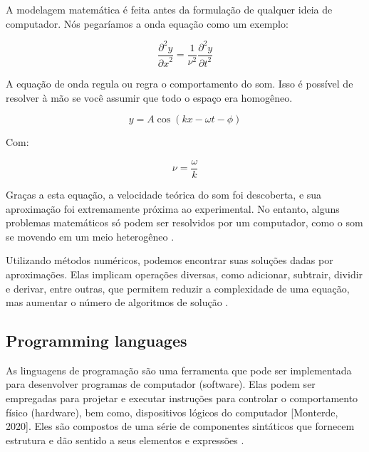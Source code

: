 \documentclass[11pt, letterpaper, portuguese]{article}
\begin{document}
\par{A modelagem matemática é feita antes da formulação de qualquer ideia de computador. Nós pegaríamos a onda equação como um exemplo:}

\begin{equation}
    \frac{\partial^2 y}{{\partial x}^2}=\frac{1}{\nu^2} \frac{\partial^2 y}{{\partial t}^2}
\end{equation}

\par{A equação de onda regula ou regra o comportamento do som. Isso é possível de resolver à mão se você assumir que todo o espaço era homogêneo. }

\begin{equation*}
    y= A \cos{ \left( k x - \omega t - \phi \right) }
\end{equation*}

\par{Com:}

\begin{equation*}
    \nu = \frac{ \omega }{ k }
\end{equation*}

\par{Graças a esta equação, a velocidade teórica do som foi descoberta, e sua aproximação foi extremamente próxima ao experimental. No entanto, alguns problemas matemáticos só podem ser resolvidos por um computador, como o som se movendo em um meio heterogêneo  \cite{garfinkel_shevtsov_guo_2017}.}

\par{Utilizando métodos numéricos, podemos encontrar suas soluções dadas por aproximações. Elas implicam operações diversas, como adicionar, subtrair, dividir e derivar, entre outras, que permitem reduzir a complexidade de uma equação, mas aumentar o número de algoritmos de solução  \cite{garfinkel_shevtsov_guo_2017}.}



    \subsection{Programming languages}
    
    \par{As linguagens de programação são uma ferramenta que pode ser implementada para desenvolver programas de computador (software). Elas podem ser empregadas para projetar e executar instruções para controlar o comportamento físico (hardware), bem como, dispositivos lógicos do computador [Monterde, 2020]. Eles são compostos de uma série de componentes sintáticos que fornecem estrutura e dão sentido a seus elementos e expressões  \cite{garfinkel_shevtsov_guo_2017}.} 
    
\end{document}
